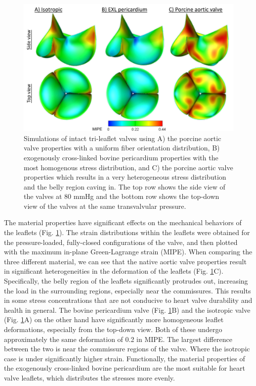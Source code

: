     
\begin{figure}
\centering
\includegraphics[width=\textwidth]{Images/chapter5/valvesimulations}
\caption{Simulations of intact tri-leaflet valves using A) the porcine aortic valve properties with a uniform fiber orientation distribution, B) exogenously cross-linked bovine pericardium properties with the most homogenous stress distribution, and C) the porcine aortic valve properties which results in a very heterogeneous stress distribution and the belly region caving in. The top row shows the side view of the valves at 80 mmHg and the bottom row shows the top-down view of the valves at the same transvalvular pressure.}
\label{fig:valvesimulations}
\end{figure}
    
    The material properties have significant effects on the mechanical behaviors of the leaflets (Fig. \ref{fig:valvesimulations}). The strain distributions within the leaflets were obtained for the pressure-loaded, fully-closed configurations of the valve, and then plotted with the maximum in-plane Green-Lagrange strain (MIPE). When comparing the three different material, we can see that the native aortic valve properties result in significant heterogeneities in the deformation of the leaflets (Fig. \ref{fig:valvesimulations}C). Specifically, the belly region of the leaflets significantly protrudes out, increasing the load in the surrounding regions, especially near the commissures. This results in some stress concentrations that are not conducive to heart valve durability and health in general. The bovine pericardium valve (Fig. \ref{fig:valvesimulations}B) and the isotropic valve (Fig. \ref{fig:valvesimulations}A) on the other hand have significantly more homogeneous leaflet deformations, especially from the top-down view. Both of these undergo approximately the same deformation of 0.2 in MIPE. The largest difference between the two is near the commissure regions of the valve. Where the isotropic case is under significantly higher strain. Functionally, the material properties of the exogenously cross-linked bovine pericardium are the most suitable for heart valve leaflets, which distributes the stresses more evenly. 
    
